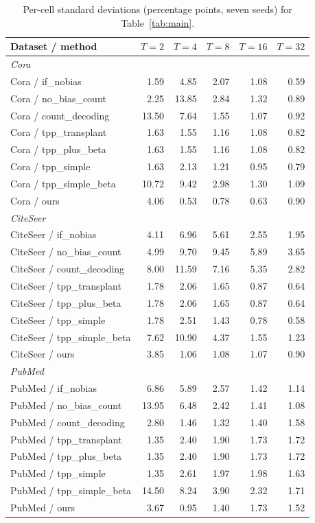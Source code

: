 \begin{table}[t]
\centering
\footnotesize
\caption{Per-cell standard deviations (percentage points, seven seeds) for
Table~\ref{tab:main}.}
\label{tab:std}
\begin{tabular}{lrrrrr}
\toprule
Dataset / method & $T{=}2$ & $T{=}4$ & $T{=}8$ & $T{=}16$ & $T{=}32$ \\
\midrule
\multicolumn{6}{l}{\emph{Cora}} \\
Cora / if\_nobias & 1.59 & 4.85 & 2.07 & 1.08 & 0.59 \\
Cora / no\_bias\_count & 2.25 & 13.85 & 2.84 & 1.32 & 0.89 \\
Cora / count\_decoding & 13.50 & 7.64 & 1.55 & 1.07 & 0.92 \\
Cora / tpp\_transplant & 1.63 & 1.55 & 1.16 & 1.08 & 0.82 \\
Cora / tpp\_plus\_beta & 1.63 & 1.55 & 1.16 & 1.08 & 0.82 \\
Cora / tpp\_simple & 1.63 & 2.13 & 1.21 & 0.95 & 0.79 \\
Cora / tpp\_simple\_beta & 10.72 & 9.42 & 2.98 & 1.30 & 1.09 \\
Cora / ours & 4.06 & 0.53 & 0.78 & 0.63 & 0.90 \\
\midrule
\multicolumn{6}{l}{\emph{CiteSeer}} \\
CiteSeer / if\_nobias & 4.11 & 6.96 & 5.61 & 2.55 & 1.95 \\
CiteSeer / no\_bias\_count & 4.99 & 9.70 & 9.45 & 5.89 & 3.65 \\
CiteSeer / count\_decoding & 8.00 & 11.59 & 7.16 & 5.35 & 2.82 \\
CiteSeer / tpp\_transplant & 1.78 & 2.06 & 1.65 & 0.87 & 0.64 \\
CiteSeer / tpp\_plus\_beta & 1.78 & 2.06 & 1.65 & 0.87 & 0.64 \\
CiteSeer / tpp\_simple & 1.78 & 2.51 & 1.43 & 0.78 & 0.58 \\
CiteSeer / tpp\_simple\_beta & 7.62 & 10.90 & 4.37 & 1.55 & 1.23 \\
CiteSeer / ours & 3.85 & 1.06 & 1.08 & 1.07 & 0.90 \\
\midrule
\multicolumn{6}{l}{\emph{PubMed}} \\
PubMed / if\_nobias & 6.86 & 5.89 & 2.57 & 1.42 & 1.14 \\
PubMed / no\_bias\_count & 13.95 & 6.48 & 2.42 & 1.41 & 1.08 \\
PubMed / count\_decoding & 2.80 & 1.46 & 1.32 & 1.40 & 1.58 \\
PubMed / tpp\_transplant & 1.35 & 2.40 & 1.90 & 1.73 & 1.72 \\
PubMed / tpp\_plus\_beta & 1.35 & 2.40 & 1.90 & 1.73 & 1.72 \\
PubMed / tpp\_simple & 1.35 & 2.61 & 1.97 & 1.98 & 1.63 \\
PubMed / tpp\_simple\_beta & 14.50 & 8.24 & 3.90 & 2.32 & 1.71 \\
PubMed / ours & 3.67 & 0.95 & 1.40 & 1.73 & 1.52 \\
\bottomrule
\end{tabular}
\end{table}
